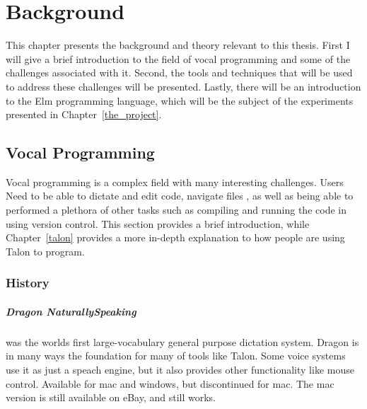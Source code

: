 \documentclass[../thesis.tex]{subfiles}
\begin{document}
\chapter{Background}\label{background}
This chapter presents the background and theory relevant to this thesis.
First I will give a brief introduction to the field of vocal programming
and some of the challenges associated with it.
Second, the tools and techniques that will be used
to address these challenges will be presented.
Lastly, there will be an introduction to the Elm
programming language, which will be the subject
of the experiments presented in Chapter~\ref{the_project}.


\section{Vocal Programming}

Vocal programming is a complex field with many interesting challenges.
Users Need to be able to dictate and edit code, navigate files
, as well as being able to performed a plethora
of other tasks such as compiling and running the code in using version control.
This section provides a brief introduction, while Chapter~\ref{talon}
provides a more in-depth explanation to how people are using Talon to program.

\subsection{History}

\paragraph{Dragon NaturallySpeaking}
was the worlds first large-vocabulary general purpose dictation system.
Dragon is in many ways the foundation for many of tools like Talon.
Some voice systems use it as just a speach engine, but it also provides other functionality like mouse control.
Available for mac and windows, but discontinued for mac.%
The mac version is still available on eBay, and still works. %
\end{document}
